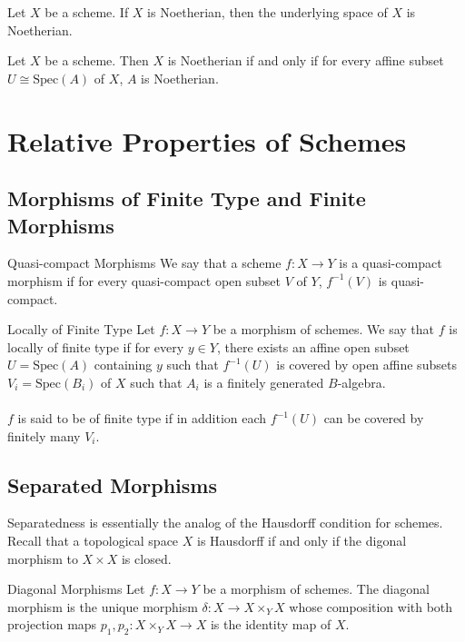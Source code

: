 \documentclass[a4paper]{article}
\begin{document}
\begin{lmm}{}{} Let $X$ be a scheme. If $X$ is Noetherian, then the underlying space of $X$ is Noetherian. 
\end{lmm}

\begin{prp}{}{} Let $X$ be a scheme. Then $X$ is Noetherian if and only if for every affine subset $U\cong\text{Spec}(A)$ of $X$, $A$ is Noetherian. 
\end{prp}

\pagebreak
\section{Relative Properties of Schemes}
\subsection{Morphisms of Finite Type and Finite Morphisms}
\begin{defn}{Quasi-compact Morphisms}{} We say that a scheme $f:X\to Y$ is a quasi-compact morphism if for every quasi-compact open subset $V$ of $Y$, $f^{-1}(V)$ is quasi-compact. 
\end{defn}

\begin{defn}{Locally of Finite Type}{} Let $f:X\to Y$ be a morphism of schemes. We say that $f$ is locally of finite type if for every $y\in Y$, there exists an affine open subset $U=\text{Spec}(A)$ containing $y$ such that $f^{-1}(U)$ is covered by open affine subsets $V_i=\text{Spec}(B_i)$ of $X$ such that $A_i$ is a finitely generated $B$-algebra. \\~\\

$f$ is said to be of finite type if in addition each $f^{-1}(U)$ can be covered by finitely many $V_i$. 
\end{defn}

\subsection{Separated Morphisms}
Separatedness is essentially the analog of the Hausdorff condition for schemes. Recall that a topological space $X$ is Hausdorff if and only if the digonal morphism to $X\times X$ is closed. 

\begin{defn}{Diagonal Morphisms}{} Let $f:X\to Y$ be a morphism of schemes. The diagonal morphism is the unique morphism $\delta:X\to X\times_Y X$ whose composition with both projection maps $p_1,p_2:X\times_Y X\to X$ is the identity map of $X$. 
\end{defn}
\end{document}
